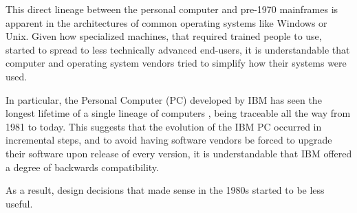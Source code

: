This direct lineage between the personal computer and pre-1970 mainframes is apparent in the architectures of common operating systems like Windows or Unix. Given how specialized machines, that required trained people to use, started to spread to less technically advanced end-users, it is understandable that computer and operating system vendors tried to simplify how their systems were used.

In particular, the Personal Computer (PC) developed by IBM has seen the longest lifetime of a single lineage of computers \cite{TGPCHis}, being traceable all the way from 1981 to today. This suggests that the evolution of the IBM PC occurred in incremental steps, and to avoid having software vendors be forced to upgrade their software upon release of every version, it is understandable that IBM offered a degree of backwards compatibility.

As a result, design decisions that made sense in the 1980s started to be less useful.
